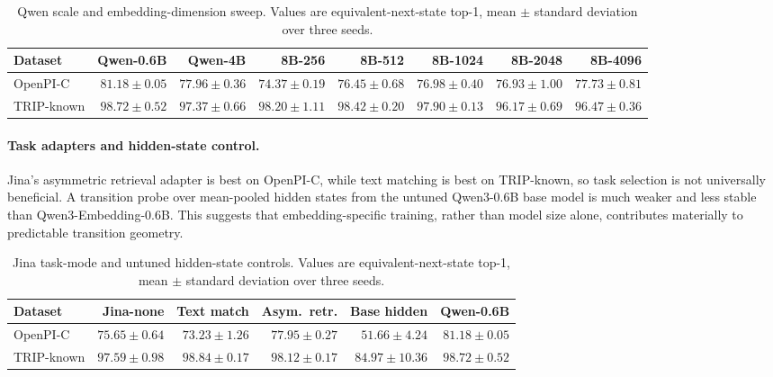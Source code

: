 \documentclass{article}
\begin{document}
\begin{table}[H]
  \centering
  \caption{Qwen scale and embedding-dimension sweep. Values are equivalent-next-state top-1, mean $\pm$ standard deviation over three seeds.}
  \label{tab:qwen-scale-dimension}
  \footnotesize
  \setlength{\tabcolsep}{1.5pt}
  \begin{tabular}{lrrrrrrr}
    \toprule
    Dataset & Qwen-0.6B & Qwen-4B & 8B-256 & 8B-512 & 8B-1024 & 8B-2048 & 8B-4096 \\
    \midrule
    OpenPI-C & $81.18{\pm}0.05$ & $77.96{\pm}0.36$ & $74.37{\pm}0.19$ & $76.45{\pm}0.68$ & $76.98{\pm}0.40$ & $76.93{\pm}1.00$ & $77.73{\pm}0.81$ \\
    TRIP-known & $98.72{\pm}0.52$ & $97.37{\pm}0.66$ & $98.20{\pm}1.11$ & $98.42{\pm}0.20$ & $97.90{\pm}0.13$ & $96.17{\pm}0.69$ & $96.47{\pm}0.36$ \\
    \bottomrule
  \end{tabular}
\end{table}

\paragraph{Task adapters and hidden-state control.}
Jina's asymmetric retrieval adapter is best on OpenPI-C, while text matching is best on TRIP-known, so task selection is not universally beneficial. A transition probe over mean-pooled hidden states from the untuned Qwen3-0.6B base model is much weaker and less stable than Qwen3-Embedding-0.6B. This suggests that embedding-specific training, rather than model size alone, contributes materially to predictable transition geometry.

\begin{table}[H]
  \centering
  \caption{Jina task-mode and untuned hidden-state controls. Values are equivalent-next-state top-1, mean $\pm$ standard deviation over three seeds.}
  \label{tab:jina-hidden-controls}
  \small
  \setlength{\tabcolsep}{3pt}
  \begin{tabular}{lrrrrr}
    \toprule
    Dataset & Jina-none & Text match & Asym.\ retr. & Base hidden & Qwen-0.6B \\
    \midrule
    OpenPI-C & $75.65{\pm}0.64$ & $73.23{\pm}1.26$ & $77.95{\pm}0.27$ & $51.66{\pm}4.24$ & $81.18{\pm}0.05$ \\
    TRIP-known & $97.59{\pm}0.98$ & $98.84{\pm}0.17$ & $98.12{\pm}0.17$ & $84.97{\pm}10.36$ & $98.72{\pm}0.52$ \\
    \bottomrule
  \end{tabular}
\end{table}
\end{document}
